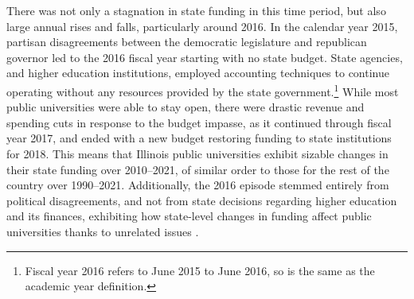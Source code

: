 There was not only a stagnation in state funding in this time period, but also large annual rises and falls, particularly around 2016.
In the calendar year 2015, partisan disagreements between the democratic legislature and republican governor led to the 2016 fiscal year starting with no state budget.
State agencies, and higher education institutions, employed accounting techniques to continue operating without any resources provided by the state government.\footnote{
    Fiscal year 2016 refers to June 2015 to June 2016, so is the same as the academic year definition.
}
While most public universities were able to stay open, there were drastic revenue and spending cuts in response to the budget impasse, as it continued through fiscal year 2017, and ended with a new budget restoring funding to state institutions for 2018.
This means that Illinois public universities exhibit sizable changes in their state funding over 2010--2021, of similar order to those for the rest of the country over 1990--2021.
Additionally, the 2016 episode stemmed entirely from political disagreements, and not from state decisions regarding higher education and its finances, exhibiting how state-level changes in funding affect public universities thanks to unrelated issues \citep{young2020squandered}.
